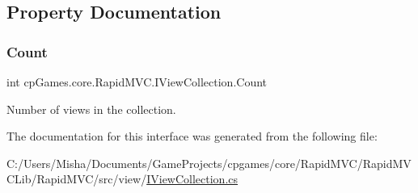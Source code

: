 \subsection{Property Documentation}
\mbox{\label{interfacecp_games_1_1core_1_1_rapid_m_v_c_1_1_i_view_collection_a695e9747a76ed53cb845020e4171953a}} 
\subsubsection{\texorpdfstring{Count}{Count}}
{\footnotesize\ttfamily int cp\+Games.\+core.\+Rapid\+M\+V\+C.\+I\+View\+Collection.\+Count\hspace{0.3cm}{\ttfamily [get]}}



Number of views in the collection. 



The documentation for this interface was generated from the following file\+:\begin{DoxyCompactItemize}
\item 
C\+:/\+Users/\+Misha/\+Documents/\+Game\+Projects/cpgames/core/\+Rapid\+M\+V\+C/\+Rapid\+M\+V\+C\+Lib/\+Rapid\+M\+V\+C/src/view/\mbox{\hyperlink{_i_view_collection_8cs}{I\+View\+Collection.\+cs}}\end{DoxyCompactItemize}
